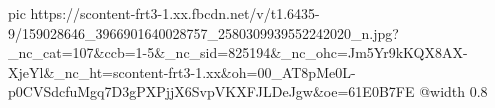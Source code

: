  
 
 
 
 

\ifcmt
  pic https://scontent-frt3-1.xx.fbcdn.net/v/t1.6435-9/159028646_3966901640028757_2580309939552242020_n.jpg?_nc_cat=107&ccb=1-5&_nc_sid=825194&_nc_ohc=Jm5Yr9kKQX8AX-XjeYl&_nc_ht=scontent-frt3-1.xx&oh=00_AT8pMe0L-p0CVSdcfuMgq7D3gPXPjjX6SvpVKXFJLDeJgw&oe=61E0B7FE
  @width 0.8
\fi
